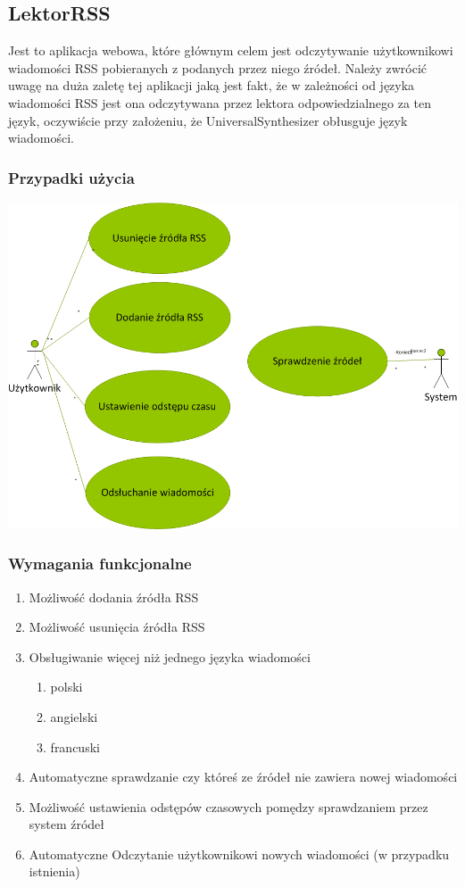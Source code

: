 \subsection{LektorRSS}
Jest to aplikacja webowa, które głównym celem jest odczytywanie użytkownikowi wiadomości RSS pobieranych z podanych przez niego źródeł. Należy zwrócić uwagę na duża zaletę tej aplikacji jaką jest fakt, że w zależności od języka wiadomości RSS jest ona odczytywana przez lektora odpowiedzialnego za ten język, oczywiście przy założeniu, że UniversalSynthesizer obłusguje język wiadomości.
\subsubsection{Przypadki użycia}
\includegraphics[scale=0.55]{useCaseRSS.png} 
\subsubsection{Wymagania funkcjonalne}
\begin{enumerate}
	\item Możliwość dodania źródła RSS
	\item Możliwość usunięcia źródła RSS
	\item Obsługiwanie więcej niż jednego języka wiadomości
		\begin{enumerate}
			\item polski
			\item angielski
			\item francuski
		\end{enumerate}
	\item Automatyczne sprawdzanie czy któreś ze źródeł nie zawiera nowej wiadomości
	\item Możliwość ustawienia odstępów czasowych pomędzy sprawdzaniem przez system źródeł
	\item Automatyczne Odczytanie użytkownikowi nowych wiadomości (w przypadku istnienia) 
\end{enumerate}  
